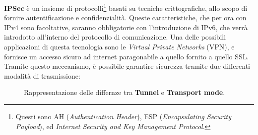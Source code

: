 \textbf{IPSec} è un insieme di protocolli\footnote{Questi sono AH (\textit{Authentication
Header}), ESP (\textit{Encapsulating Security Payload}), ed \textit{Internet Security and
Key Management Protocol}.} basati su tecniche crittografiche, allo scopo di 
fornire autentificazione e confidenzialità. Queste caratteristiche, che per ora
con IPv4 sono facoltative, saranno obbligatorie con l'introduzione di IPv6, che
verrà introdotto all'interno del protocollo di comunicazione. Una delle 
possibili applicazioni di questa tecnologia sono le \textit{Virtual Private Networks}
(VPN), e fornisce un accesso sicuro ad internet paragonabile a quello fornito a
 quello SSL. Tramite questo meccanismo, è possibile garantire sicurezza tramite
due differenti modalità di trasmissione: 
\begin{figure}[t]
\centering
{}\quad
{}\quad
\caption{Rappresentazione delle differnze tra \textbf{Tunnel} e \textbf{Transport mode}.}
\end{figure}
